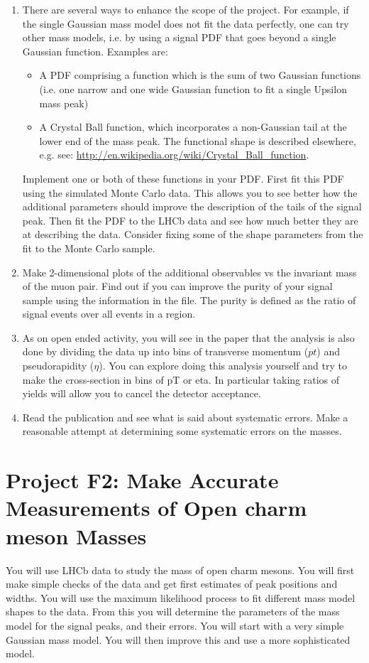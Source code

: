 \begin{enumerate}
\item There are several ways to enhance the scope of the project. For example, if the single Gaussian mass model does not fit the data perfectly, one can try other mass models, i.e. by using a signal PDF that goes beyond a single Gaussian function.  Examples are:
\begin{itemize}
\item A PDF comprising a function which is the sum of two Gaussian functions (i.e. one narrow and one wide Gaussian function to fit a single Upsilon mass peak)
\item A Crystal Ball function, which incorporates a non-Gaussian tail at the lower end of the mass peak. The functional shape is described elsewhere, e.g. see: \url{http://en.wikipedia.org/wiki/Crystal_Ball_function}. 
\end{itemize}
Implement one or both of these functions in your PDF. 
First fit this PDF using the simulated Monte Carlo data. This allows you to see better
how the additional parameters should improve the description of the tails of the signal peak.
Then fit the PDF to the LHCb data and see how much better they are at describing the data.
Consider fixing some of the shape parameters from the fit to the Monte Carlo sample.

\item Make 2-dimensional plots of the additional observables vs the invariant mass of the muon pair.
Find out if you can improve the purity of your signal sample using the information in the file.
The purity is defined as the ratio of signal events over all events in a region.

\item As on open ended activity, you will see in the paper that the analysis is also done by dividing the data up into bins of transverse momentum ($pt$) and pseudorapidity ($\eta$). You can explore doing this analysis yourself and try to make the cross-section in bins of pT or eta. In particular taking ratios of yields will allow you to cancel the detector acceptance.
  
\item Read the publication and see what is said about systematic errors.  Make a reasonable attempt at determining some systematic errors on the masses.


\end{enumerate}

 
 
 
\newpage
\section{Project F2: Make Accurate Measurements of Open charm meson Masses}
%
You will use LHCb data to study the mass of open charm mesons. You will first make simple checks of the data and get first estimates of peak positions and widths. You will use the maximum likelihood process to fit different mass model shapes to the data. From this you will determine the parameters of the mass model for the signal peaks, and their errors. You will start with a very simple Gaussian mass model. You will then improve this and use a more sophisticated model. 

